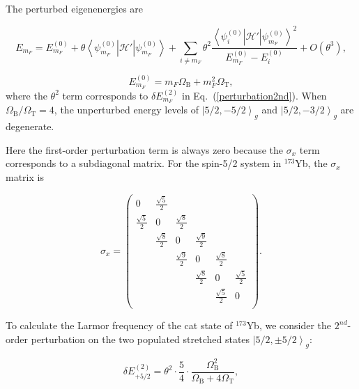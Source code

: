 \documentclass[pdflatex,sn-nature,centre]{sn-jnl}%
\begin{document}
The perturbed eigenenergies are

\begin{equation}\label{perturbation}
    E_{m_F} = E_{m_F}^{(0)}
     +\theta\left\langle \psi_{m_F}^{(0)}\right\vert\mathscr{H}'\left\vert\psi_{m_F}^{(0)}\right\rangle
    +\sum_{i\neq {m_F}}\theta^2    \dfrac{{\left\langle\psi_i^{(0)}\right\vert\mathscr{H}'\left\vert\psi_{m_F}^{(0)} \right\rangle}^2}
    {E_{m_F}^{(0)}-E_i^{(0)}}
    +O(\theta^3),
\end{equation}

\begin{equation}\label{E(0)}
    E_{m_F}^{(0)}=m_F\Omega_{\mathrm B}+m_F^2\Omega_{\mathrm T},
\end{equation}
where the $\theta^2$ term corresponds to $\delta E_{m_F}^{(2)}$ in Eq.~(\ref{perturbation2nd}). When $\Omega_{\mathrm B}/\Omega_{\mathrm T}=4$, the unperturbed energy levels of $\left\vert5/2,-5/2\right\rangle_g$ and $\left\vert5/2,-3/2\right\rangle_g$ are degenerate.

Here the first-order perturbation term is always zero because the $\sigma_x$ term corresponds to a subdiagonal matrix. 
For the spin-5/2 system in $^{173}$Yb, the $\sigma_x$ matrix is

\begin{equation}
\sigma_x = 
    \begin{pmatrix}
        0 & \frac{\sqrt{5}}{2} & & & & \\
        \frac{\sqrt{5}}{2} & 0 & \frac{\sqrt{8}}{2} & & & \\
         & \frac{\sqrt{8}}{2} & 0 & \frac{\sqrt{9}}{2} & & \\
         & & \frac{\sqrt{9}}{2} & 0 & \frac{\sqrt{8}}{2} & \\
         & & & \frac{\sqrt{8}}{2} & 0 & \frac{\sqrt{5}}{2}\\
         & & & & \frac{\sqrt{5}}{2} & 0 \\
    \end{pmatrix}.
\end{equation}

To calculate the Larmor frequency of the cat state of $^{173}$Yb, we consider the $2^{nd}$-order perturbation on the two populated stretched states $\left\vert5/2,\pm5/2\right\rangle_g$:

\begin{equation}\label{E+5/2}
    \delta E_{+5/2}^{(2)} = \theta^2\cdot\dfrac{5}{4}\cdot\dfrac{\Omega_{\mathrm B}^2}{\Omega_{\mathrm B}+4\Omega_{\mathrm T}},
\end{equation}
\end{document}
